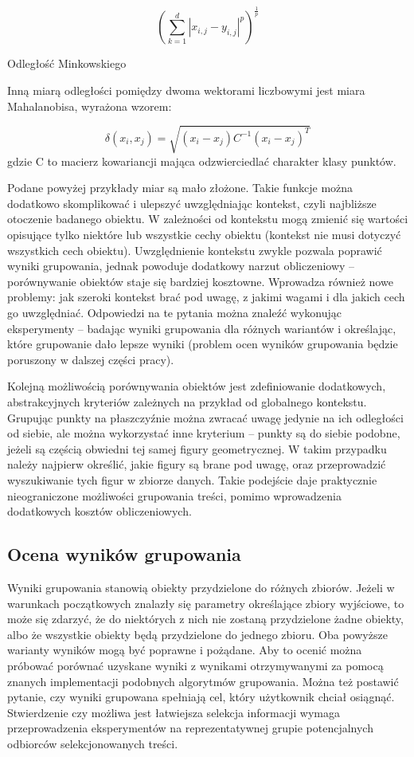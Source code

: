 \documentclass{article}
\begin{document}
\begin{maths}
	\centering
	\[(\sum_{k=1}^{d} |x_{i,j} - y_{i,j}|^p)^\frac{1}{p}\]
	\caption{Odległość Minkowskiego}
	\label{mth:minkowski}
\end{maths}


Inną miarą odległości pomiędzy dwoma wektorami liczbowymi jest miara Mahalanobisa, wyrażona wzorem:

\[\delta(x_{i}, x_{j}) = \sqrt{(x_{i} - x_{j})C^{-1}(x_{i} - x_{j})^T} \]
gdzie C to macierz kowariancji mająca odzwierciedlać charakter klasy punktów.

Podane powyżej przykłady miar są mało złożone. Takie funkcje można dodatkowo skomplikować i ulepszyć uwzględniając kontekst, czyli najbliższe otoczenie badanego obiektu. W zależności od kontekstu mogą zmienić się wartości opisujące tylko niektóre lub wszystkie cechy obiektu (kontekst nie musi dotyczyć wszystkich cech obiektu). Uwzględnienie kontekstu zwykle pozwala poprawić wyniki grupowania, jednak powoduje dodatkowy narzut obliczeniowy – porównywanie obiektów staje się bardziej kosztowne. Wprowadza również nowe problemy: jak szeroki kontekst brać pod uwagę, z jakimi wagami i dla jakich cech go uwzględniać. Odpowiedzi na te pytania można znaleźć wykonując eksperymenty – badając wyniki grupowania dla różnych wariantów i określając, które grupowanie dało lepsze wyniki (problem ocen wyników grupowania będzie poruszony w dalszej części pracy).

Kolejną możliwością porównywania obiektów jest zdefiniowanie dodatkowych, abstrakcyjnych kryteriów zależnych na przykład od globalnego kontekstu. Grupując punkty na płaszczyźnie można zwracać uwagę jedynie na ich odległości od siebie, ale można wykorzystać inne kryterium – punkty są do siebie podobne, jeżeli są częścią obwiedni tej samej figury geometrycznej. W takim przypadku należy najpierw określić, jakie figury są brane pod uwagę, oraz przeprowadzić wyszukiwanie tych figur w zbiorze danych. Takie podejście daje praktycznie nieograniczone możliwości grupowania treści, pomimo wprowadzenia dodatkowych kosztów obliczeniowych.

\subsection{Ocena wyników grupowania}

Wyniki grupowania stanowią obiekty przydzielone do różnych zbiorów. Jeżeli w warunkach początkowych znalazły się parametry określające zbiory wyjściowe, to może się zdarzyć, że do niektórych z nich nie zostaną przydzielone żadne obiekty, albo że wszystkie obiekty będą przydzielone do jednego zbioru. Oba powyższe warianty wyników mogą być poprawne i pożądane. Aby to ocenić można próbować porównać uzyskane wyniki z wynikami otrzymywanymi za pomocą znanych implementacji podobnych algorytmów grupowania. Można też postawić pytanie, czy wyniki grupowana spełniają cel, który użytkownik chciał osiągnąć. Stwierdzenie czy możliwa jest łatwiejsza selekcja informacji wymaga przeprowadzenia eksperymentów na reprezentatywnej grupie potencjalnych odbiorców selekcjonowanych treści.
\end{document}
